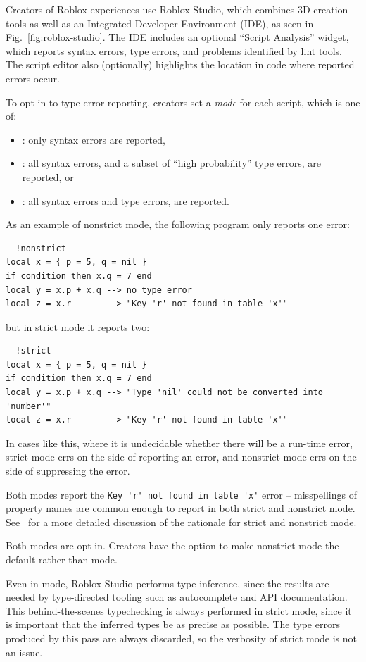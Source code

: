 \documentclass[english,submission,cleveref]{programming}
\begin{document}
Creators of {Roblox experiences} use {Roblox Studio},
which combines {3D creation} tools as well as an Integrated
Developer Environment (IDE), as seen in Fig.~\ref{fig:roblox-studio}.
The IDE includes an optional ``Script Analysis'' widget, which
reports syntax errors, type errors, and problems identified by
lint tools. The script editor also (optionally) highlights
the location in code where reported errors occur.

To opt in to type error reporting, creators set a \emph{mode}
for each script, which is one of:
\begin{itemize}
  \item \mnocheck{}: only syntax errors are reported,
  \item \mnonstrict{}: all syntax errors, and a subset of ``high probability'' type errors, are reported, or
  \item \mstrict{}: all syntax errors and type errors, are reported.
\end{itemize}
As an example of nonstrict mode, the following program only reports one error:
\begin{verbatim}
--!nonstrict
local x = { p = 5, q = nil }
if condition then x.q = 7 end
local y = x.p + x.q --> no type error
local z = x.r       --> "Key 'r' not found in table 'x'"
\end{verbatim}
but in strict mode it reports two:
\begin{verbatim}
--!strict
local x = { p = 5, q = nil }
if condition then x.q = 7 end
local y = x.p + x.q --> "Type 'nil' could not be converted into 'number'"
local z = x.r       --> "Key 'r' not found in table 'x'"
\end{verbatim}
In cases like this, where it is undecidable whether there will be a run-time error,
strict mode errs on the side of reporting an error, and nonstrict mode errs on
the side of suppressing the error.

Both modes report the \verb|Key 'r' not found in table 'x'| error --
misspellings of property names are common enough to report in both
strict and nonstrict mode. See~\cite{bfj-hatra-2021}
for a more detailed discussion of the rationale for strict and nonstrict mode.

Both modes are opt-in. Creators have the option to make nonstrict mode
the default rather than \mnocheck{} mode.

Even in \mnocheck{} mode, {Roblox Studio} performs type inference, since
the results are needed by type-directed tooling such as autocomplete and
API documentation. This behind-the-scenes typechecking is always performed
in strict mode, since it is important that the inferred types be as precise
as possible. The type errors produced by this pass are always discarded,
so the verbosity of strict mode is not an issue.
\end{document}
